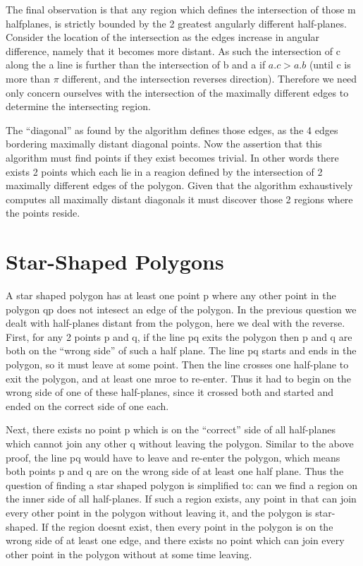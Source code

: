 The final observation is that any region which defines the intersection of those m halfplanes, is strictly bounded by the 2 greatest angularly different half-planes.
Consider the location of the intersection as the edges increase in angular difference, namely that it becomes more distant.
As such the intersection of c along the a line is further than the intersection of b and a if $a.c > a.b$ (until c is more than $\pi$ different, and the intersection reverses direction).
Therefore we need only concern ourselves with the intersection of the maximally different edges to determine the intersecting region.

The ``diagonal'' as found by the algorithm defines those edges, as the 4 edges bordering maximally distant diagonal points.
Now the assertion that this algorithm must find points if they exist becomes trivial.
In other words there exists 2 points which each lie in a reagion defined by the intersection of 2 maximally different edges of the polygon.
Given that the algorithm exhaustively computes all maximally distant diagonals it must discover those 2 regions where the points reside.

\section {Star-Shaped Polygons}

A star shaped polygon has at least one point p where any other point in the polygon qp does not intesect an edge of the polygon.
In the previous question we dealt with half-planes distant from the polygon, here we deal with the reverse.
First, for any 2 points p and q, if the line pq exits the polygon then p and q are both on the ``wrong side'' of such a half plane.
The line pq starts and ends in the polygon, so it must leave at some point.
Then the line crosses one half-plane to exit the polygon, and at least one mroe to re-enter.
Thus it had to begin on the wrong side of one of these half-planes, since it crossed both and started and ended on the correct side of one each.

Next, there exists no point p which is on the ``correct'' side of all half-planes which cannot join any other q without leaving the polygon.
Similar to the above proof, the line pq would have to leave and re-enter the polygon, which means both points p and q are on the wrong side of at least one half plane.
Thus the question of finding a star shaped polygon is simplified to: can we find a region on the inner side of all half-planes.
If such a region exists, any point in that can join every other point in the polygon without leaving it, and the polygon is star-shaped.
If the region doesnt exist, then every point in the polygon is on the wrong side of at least one edge, and there exists no point which can join every other point in the polygon without at some time leaving.

